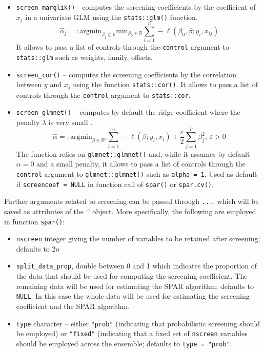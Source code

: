 \documentclass[
  article]{jss}
\newcommand{\class}[1]{`\code{#1}'}
\begin{document}
\begin{itemize}
\item
  \texttt{screen\_marglik()} - computes the screening coefficients by
  the coefficient of \(x_j\) in a univariate GLM using the
  \texttt{stats::glm()} function. \[
   \hat\alpha_j=:\text{argmin}_{\beta_j\in \mathbb{R}}\text{min}_{{\beta_0}\in\mathbb{R}}\sum_{i=1}^n -\ell(\beta_0,\beta;y_i,x_{ij})
   \] It allows to pass a list of controls through the \texttt{control}
  argument to \texttt{stats::glm} such as weights, family, offsets.
\item
  \texttt{screen\_cor()} -- computes the screening coefficients by the
  correlation between \(y\) and \(x_j\) using the function
  \texttt{stats::cor()}. It allows to pass a list of controls through
  the \texttt{control} argument to \texttt{stats::cor}.
\item
  \texttt{screen\_glmnet()} -- computes by default the ridge coefficient
  where the penalty \(\lambda\) is very small \citep[see][ for
  motivation]{parzer2024glms}. \[
  \hat\alpha=: \text{argmin}_{{\beta}\in\mathbb{R}^p}\sum_{i=1}^n -\ell(\beta;y_i,x_i) + \frac{\varepsilon}{2}\sum_{j=1}^p{\beta}_j^2, \, \varepsilon > 0
  \] The function relies on \texttt{glmnet::glmnet()} and, while it
  assumes by default \(\alpha = 0\) and a small penalty, it allows to
  pass a list of controls through the \texttt{control} argument to
  \texttt{glmnet::glmnet()} such as \texttt{alpha\ =\ 1}. Used as
  default if \texttt{screencoef\ =\ NULL} in function call of
  \texttt{spar()} or \texttt{spar.cv()}.
\end{itemize}

Further arguments related to screening can be passed through
\texttt{...}, which will be saved as attributes of the
\class{screencoef} object. More specifically, the following are employed
in function \texttt{spar()}:

\begin{itemize}
\item
  \texttt{nscreen} integer giving the number of variables to be retained
  after screening; defaults to \(2n\)
\item
  \texttt{split\_data\_prop}, double between 0 and 1 which indicates the
  proportion of the data that should be used for computing the screening
  coefficient. The remaining data will be used for estimating the SPAR
  algorithm; defaults to \texttt{NULL}. In this case the whole data will
  be used for estimating the screening coefficient and the SPAR
  algorithm.
\item
  \texttt{type} character -- either \texttt{"prob"} (indicating that
  probabilistic screening should be employed) or \texttt{"fixed"}
  (indicating that a fixed set of \texttt{nscreen} variables should be
  employed across the ensemble; defaults to \texttt{type\ =\ "prob"}.
\end{itemize}
\end{document}
